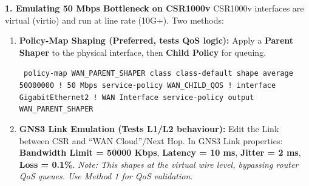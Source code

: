 \documentclass[11pt]{article}
\begin{document}
\begin{exoresolu}
\noindent\textbf{1. Emulating 50 Mbps Bottleneck on CSR1000v}
CSR1000v interfaces are virtual (virtio) and run at line rate (10G+). Two methods:
\begin{enumerate}
    \item \textbf{Policy-Map Shaping (Preferred, tests QoS logic):} Apply a \textbf{Parent Shaper} to the physical interface, then \textbf{Child Policy} for queuing.
    \begin{flushleft}
    \texttt{
    policy-map WAN\_PARENT\_SHAPER\newline
     class class-default\newline
      shape average 50000000  ! 50 Mbps\newline
      service-policy WAN\_CHILD\_QOS\newline
    !\newline
    interface GigabitEthernet2  ! WAN Interface\newline
     service-policy output WAN\_PARENT\_SHAPER
    }
    \end{flushleft}
    \item \textbf{GNS3 Link Emulation (Tests L1/L2 behaviour):} Edit the Link between CSR and ``WAN Cloud''/Next Hop. In GNS3 Link properties: \textbf{Bandwidth Limit = 50000 Kbps}, \textbf{Latency = 10 ms}, \textbf{Jitter = 2 ms}, \textbf{Loss = 0.1\%}. \textit{Note: This shapes at the virtual wire level, bypassing router QoS queues. Use Method 1 for QoS validation.}
\end{enumerate}


\end{exoresolu}
\end{document}
